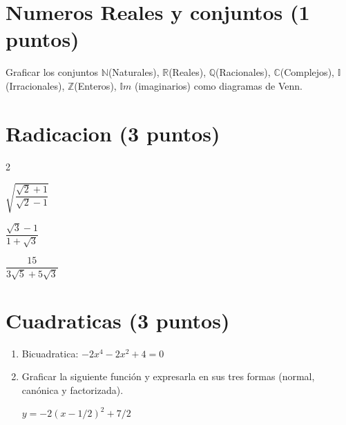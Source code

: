 \documentclass[a4paper,11pt,spanish,sans]{exam}
\begin{document}
	
		
\section{Numeros Reales y conjuntos (1 puntos) }
	Graficar los conjuntos $\mathbb{N}$(Naturales), $\mathbb{R}$(Reales), $\mathbb{Q}$(Racionales), $\mathbb{C}$(Complejos), $\mathbb{I}$(Irracionales), $\mathbb{Z}$(Enteros), $\mathbb{I}m$ (imaginarios) como diagramas de Venn.
		
\section{Radicacion (3 puntos)}	
	\begin{enumerate}
		
	\end{enumerate}
	
\section{Cuadraticas (3 puntos)}
	\begin{enumerate}
		\item Bicuadratica: $-2x^4-2x^2+4=0$
		\item Graficar la siguiente función y expresarla en sus tres formas (normal, canónica y factorizada).
		
		$y=-2(x-1/2)^2+7/2$
	\end{enumerate}
		
\end{document}

